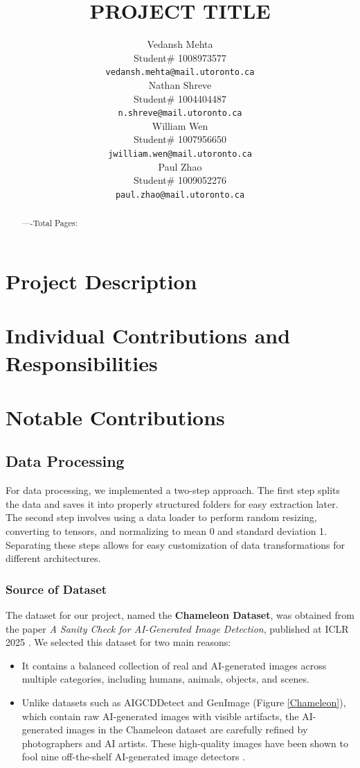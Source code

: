 \documentclass{article} %
\title{PROJECT TITLE}
\author{Vedansh Mehta  \\
Student\# 1008973577 \\
\texttt{vedansh.mehta@mail.utoronto.ca} \\
\And
Nathan Shreve  \\
Student\# 1004404487 \\
\texttt{n.shreve@mail.utoronto.ca} \\
\AND
William Wen  \\
Student\# 1007956650 \\
\texttt{jwilliam.wen@mail.utoronto.ca} \\
\And
Paul Zhao \\
Student\# 1009052276 \\
\texttt{paul.zhao@mail.utoronto.ca} \\
\AND
}
\begin{document}
\maketitle

\begin{abstract}
    ----Total Pages: \pageref{last_page}
\end{abstract}



\section{Project Description}


\section{Individual Contributions and Responsibilities}


\section{Notable Contributions}
\subsection{Data Processing}

For data processing, we implemented a two-step approach. The first step splits the data and saves it into properly structured folders for easy extraction later. The second step involves using a data loader to perform random resizing, converting to tensors, and normalizing to mean 0 and standard deviation 1. Separating these steps allows for easy customization of data transformations for different architectures.

\subsubsection{Source of Dataset}
The dataset for our project, named the \textbf{Chameleon Dataset}, was obtained from the paper \emph{A Sanity Check for AI-Generated Image Detection}, published at ICLR 2025 \citep{yan2024sanity}. We selected this dataset for two main reasons:

\begin{itemize}
    \item It contains a balanced collection of real and AI-generated images across multiple categories, including humans, animals, objects, and scenes.
    \item Unlike datasets such as AIGCDDetect and GenImage (Figure \ref{Chameleon}), which contain raw AI-generated images with visible artifacts, the AI-generated images in the Chameleon dataset are carefully refined by photographers and AI artists. These high-quality images have been shown to fool nine off-the-shelf AI-generated image detectors \citep{yan2024sanity}.
\end{itemize}
\end{document}
